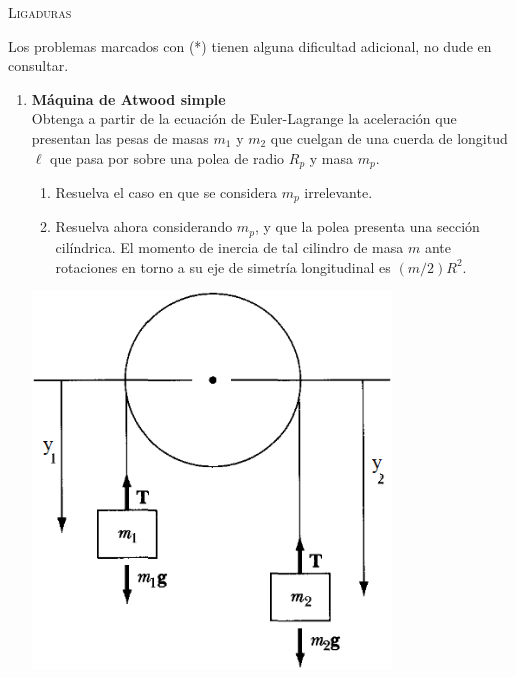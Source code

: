 \documentclass[11pt, spanish, a4paper, twoside]{article}
\begin{document}
\begin{center}
  \textsc{\large Ligaduras}
\end{center}

\noindent
Los problemas marcados con (*) tienen alguna dificultad adicional, no dude en consultar.
\begin{enumerate}


\item 
\begin{minipage}[t][3.5cm]{0.68\textwidth}
	\textbf{Máquina de Atwood simple}\\
	Obtenga a partir de la ecuación de Euler-Lagrange la aceleración que presentan las pesas de masas \(m_1\) y \(m_2\) que cuelgan de una cuerda de longitud \(\ell\) que pasa por sobre una polea de radio \(R_p\) y masa \(m_p\).
	\begin{enumerate}
		\item Resuelva el caso en que se considera \(m_p\) irrelevante.
		\item Resuelva ahora considerando \(m_p\), y que la polea presenta una sección cilíndrica.
			El momento de inercia de tal cilindro de masa \(m\) ante rotaciones en torno a su eje de simetría longitudinal es \((m/2) R^2\).
	\end{enumerate}
\end{minipage}
\begin{minipage}[c][0.5cm][t]{0.3\textwidth}
	\includegraphics[width=0.75\textwidth]{figures/marion_fig2_11a}
\end{minipage}



\end{enumerate}
\end{document}
